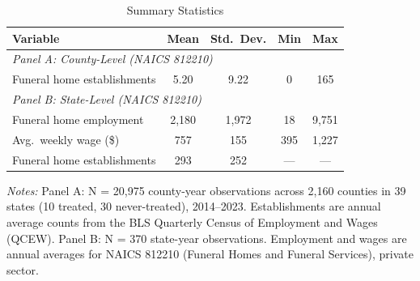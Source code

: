 \begin{table}[H]
\centering
\caption{Summary Statistics}
\begin{threeparttable}
\begin{tabular}{lcccc}
\toprule
Variable & Mean & Std.~Dev. & Min & Max \\
\midrule
\multicolumn{5}{l}{\textit{Panel A: County-Level (NAICS 812210)}} \\
Funeral home establishments & 5.20 & 9.22 & 0 & 165 \\
\midrule
\multicolumn{5}{l}{\textit{Panel B: State-Level (NAICS 812210)}} \\
Funeral home employment & 2,180 & 1,972 & 18 & 9,751 \\
Avg.~weekly wage (\$) & 757 & 155 & 395 & 1,227 \\
Funeral home establishments & 293 & 252 & --- & --- \\
\bottomrule
\end{tabular}
\begin{tablenotes}[flushleft]
\small
\item \textit{Notes:} Panel A: N = 20,975 county-year observations across 2,160 counties in 39 states (10 treated, 30 never-treated), 2014--2023. Establishments are annual average counts from the BLS Quarterly Census of Employment and Wages (QCEW). Panel B: N = 370 state-year observations. Employment and wages are annual averages for NAICS 812210 (Funeral Homes and Funeral Services), private sector.
\end{tablenotes}
\end{threeparttable}
\label{tab:summary}
\end{table}

